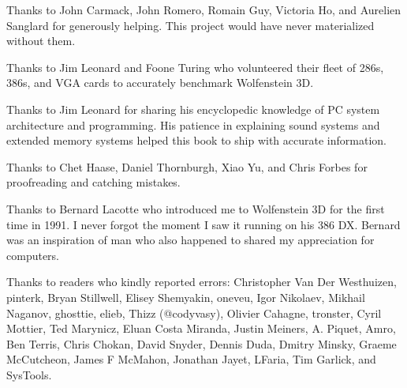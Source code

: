 Thanks to John Carmack, John Romero, Romain Guy, Victoria Ho, and Aurelien Sanglard for generously helping. This project would have never
materialized without them.\\ 
\par
Thanks to  Jim Leonard and Foone Turing who volunteered their fleet of 286s, 386s, and VGA cards to accurately benchmark Wolfenstein 3D.\\
\par
Thanks to  Jim Leonard for sharing his encyclopedic knowledge of PC system architecture and programming. His patience in explaining sound systems and extended memory systems helped this book to ship with accurate information.\\
\par
Thanks to  Chet Haase, Daniel Thornburgh, Xiao Yu, and Chris Forbes for proofreading and catching mistakes.\\
\par
Thanks to Bernard Lacotte who introduced me to Wolfenstein 3D for the first time in 1991. I never forgot the moment I saw it running on his 386 DX. Bernard was an inspiration of man who also happened to shared my appreciation for computers.\\
\par
Thanks to readers who kindly reported errors: Christopher Van Der Westhuizen, pinterk, Bryan Stillwell, Elisey Shemyakin, oneveu, Igor Nikolaev, Mikhail Naganov, ghosttie, elieb, Thizz (@codyvasy), Olivier Cahagne, tronster, Cyril Mottier, Ted Marynicz, Eluan Costa Miranda, Justin Meiners, A. Piquet, Amro, Ben Terris, Chris Chokan, David Snyder, Dennis Duda, Dmitry Minsky, Graeme McCutcheon, James F McMahon, Jonathan Jayet, LFaria, Tim Garlick, and SysTools.\\
\par


\thispagestyle{plain} %
